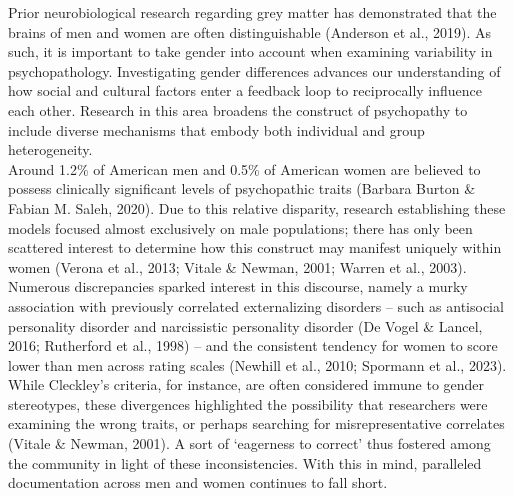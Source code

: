 \documentclass[
  man,floatsintext]{apa7}
\begin{document}
Prior neurobiological research regarding grey matter has demonstrated that the brains of men and women are often distinguishable (Anderson et al., 2019). As such, it is important to take gender into account when examining variability in psychopathology. Investigating gender differences advances our understanding of how social and cultural factors enter a feedback loop to reciprocally influence each other. Research in this area broadens the construct of psychopathy to include diverse mechanisms that embody both individual and group heterogeneity.\\
Around 1.2\% of American men and 0.5\% of American women are believed to possess clinically significant levels of psychopathic traits (Barbara Burton \& Fabian M. Saleh, 2020). Due to this relative disparity, research establishing these models focused almost exclusively on male populations; there has only been scattered interest to determine how this construct may manifest uniquely within women (Verona et al., 2013; Vitale \& Newman, 2001; Warren et al., 2003).\\
Numerous discrepancies sparked interest in this discourse, namely a murky association with previously correlated externalizing disorders -- such as antisocial personality disorder and narcissistic personality disorder (De Vogel \& Lancel, 2016; Rutherford et al., 1998) -- and the consistent tendency for women to score lower than men across rating scales (Newhill et al., 2010; Spormann et al., 2023). While Cleckley's criteria, for instance, are often considered immune to gender stereotypes, these divergences highlighted the possibility that researchers were examining the wrong traits, or perhaps searching for misrepresentative correlates (Vitale \& Newman, 2001). A sort of `eagerness to correct' thus fostered among the community in light of these inconsistencies. With this in mind, paralleled documentation across men and women continues to fall short.\\
\end{document}
